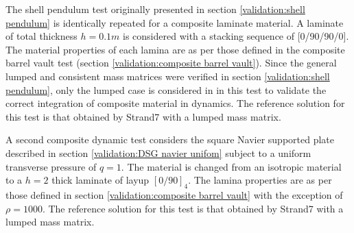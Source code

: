 The shell pendulum test originally presented in section \ref{validation:shell pendulum} is identically repeated for a composite laminate material. A laminate of total thickness $h = 0.1m$ is considered with a stacking sequence of [0/90/90/0]. The material properties of each lamina are as per those defined in the composite barrel vault test (section \ref{validation:composite barrel vault}). Since the general lumped and consistent mass matrices were verified in section \ref{validation:shell pendulum}, only the lumped case is considered in in this test to validate the correct integration of composite material in dynamics. The reference solution for this test is that obtained by Strand7 with a lumped mass matrix.

A second composite dynamic test considers the square Navier supported plate described in section \ref{validation:DSG navier unifom} subject to a uniform transverse pressure of $q = 1$. The material is changed from an isotropic material to a $h = 2$ thick laminate of layup $[0/90]_4$. The lamina properties are as per those defined in section \ref{validation:composite barrel vault} with the exception of $\rho = 1000$. The reference solution for this test is that obtained by Strand7 with a lumped mass matrix.

